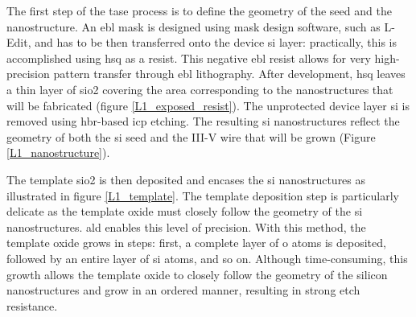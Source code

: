 The first step of the \acs{tase} process is to define the geometry of the seed and the nanostructure. An \acs{ebl} mask is designed using mask design software, such as L-Edit, and has to be then transferred onto the device \acs{si} layer: practically, this is accomplished using \acf{hsq} as a resist. This negative \acs{ebl} resist allows for very high-precision pattern transfer through \acs{ebl} lithography. After development, \acs{hsq} leaves a thin layer of \acl{sio2} covering the area corresponding to the nanostructures that will be fabricated (figure \ref{L1_exposed_resist}). The unprotected device layer \acl{si} is removed using \acf{hbr}-based \acf{icp} etching. The resulting \acl{si} nanostructures reflect the geometry of both the \acl{si} seed and the III-V wire that will be grown (Figure \ref{L1_nanostructure}). 
\par
The template \acl{sio2} is then deposited and encases the \acl{si} nanostructures as illustrated in figure \ref{L1_template}. The template deposition step is particularly delicate as the template oxide must closely follow the geometry of the \acl{si} nanostructures. \Acf{ald} enables this level of precision. With this method, the template oxide grows in steps: first, a complete layer of \acl{o} atoms is deposited, followed by an entire layer of \acl{si} atoms, and so on. Although time-consuming, this growth allows the template oxide to closely follow the geometry of the silicon nanostructures and grow in an ordered manner, resulting in strong etch resistance. 



